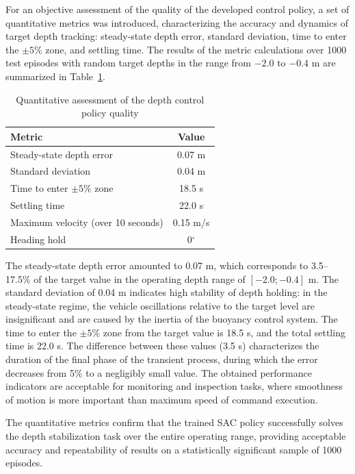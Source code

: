 \documentclass[12pt]{revtex4}
\begin{document}
For an objective assessment of the quality of the developed control policy, a set of quantitative metrics was introduced, characterizing the accuracy and dynamics of target depth tracking: steady-state depth error, standard deviation, time to enter the $\pm 5\%$ zone, and settling time. The results of the metric calculations over 1000 test episodes with random target depths in the range from $-2.0$ to $-0.4$ m are summarized in Table~\ref{tab:quantitative_metrics}.

\begin{table}
\setcaptionmargin{0mm}
\onelinecaptionstrue
{}
\caption{Quantitative assessment of the depth control policy quality}
\label{tab:quantitative_metrics}
\begin{tabular}{lc}
\hline
Metric & Value \\
\hline
Steady-state depth error & 0.07 m \\
Standard deviation & 0.04 m \\
Time to enter $\pm 5\%$ zone & 18.5 s \\
Settling time & 22.0 s \\
Maximum velocity (over 10 seconds) & 0.15 m/s \\
Heading hold & 0$^\circ$ \\
\hline
\end{tabular}
\end{table}

The steady-state depth error amounted to 0.07 m, which corresponds to 3.5--17.5\% of the target value in the operating depth range of $[-2.0; -0.4]$ m. The standard deviation of 0.04 m indicates high stability of depth holding: in the steady-state regime, the vehicle oscillations relative to the target level are insignificant and are caused by the inertia of the buoyancy control system. The time to enter the $\pm 5\%$ zone from the target value is 18.5 s, and the total settling time is 22.0 s. The difference between these values (3.5 s) characterizes the duration of the final phase of the transient process, during which the error decreases from 5\% to a negligibly small value. The obtained performance indicators are acceptable for monitoring and inspection tasks, where smoothness of motion is more important than maximum speed of command execution.

The quantitative metrics confirm that the trained SAC policy successfully solves the depth stabilization task over the entire operating range, providing acceptable accuracy and repeatability of results on a statistically significant sample of 1000 episodes.
\end{document}
